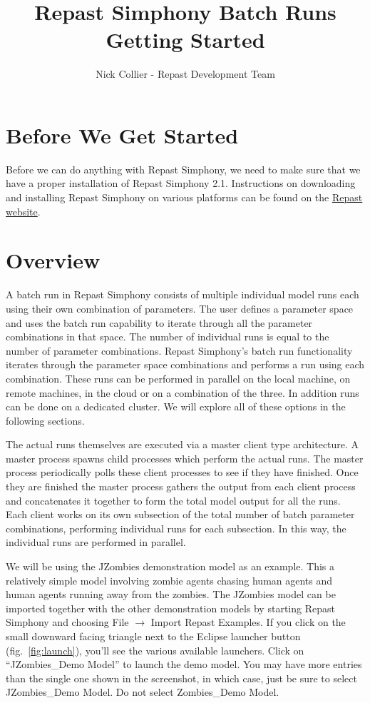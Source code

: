 \documentclass[11pt]{amsart}
\title{Repast Simphony Batch Runs Getting Started}
\author{Nick Collier  - Repast Development Team}
\begin{document}
 
\maketitle
\setcounter{section}{-1}

\section{Before We Get Started}
Before we can do anything with Repast Simphony, we need to make sure that we have a proper installation of Repast Simphony 2.1. Instructions on downloading and installing Repast Simphony on various platforms can be found on the \href{http://repast.sourceforge.net/download.html}{Repast website}.

\section{Overview}
A batch run in Repast Simphony consists of multiple individual model runs each using their own combination of parameters. The user defines a parameter space and uses the batch run capability to iterate through all the parameter combinations in that space. The number of individual runs is equal to the number of parameter combinations. Repast Simphony's batch run functionality iterates through the parameter space combinations and performs a run using each combination.  These runs can be performed in parallel on the local machine, on remote machines, in the cloud or on a combination of the three. In addition runs can be done on a dedicated cluster. We will explore all of these options in the following sections.

The actual runs themselves are executed via a master client type architecture. A master process spawns child processes which perform the actual runs. The master process periodically polls these client processes to see if they have finished. Once they are finished the master process gathers the output from each client process and concatenates it together to form the total model output for all the runs.  Each client works on its own subsection of the total number of batch parameter combinations, performing individual runs for each subsection. In this way, the individual runs are performed in parallel.

\label{sec:launch_model}
We will be using the JZombies demonstration model as an example. This a relatively simple model involving zombie agents chasing human agents and human agents running away from the zombies. The JZombies model can be imported together with the other demonstration models by starting Repast Simphony and choosing File $\rightarrow$ Import Repast Examples. If you click on the small downward facing triangle next to the Eclipse launcher button (fig.~\ref{fig:launch}), you'll see the various available launchers. Click on ``JZombies\_Demo Model'' to launch the demo model. You may have more entries than the single one shown in the screenshot, in which case, just be sure to select JZombies\_Demo Model. Do not select Zombies\_Demo Model.
\end{document}
